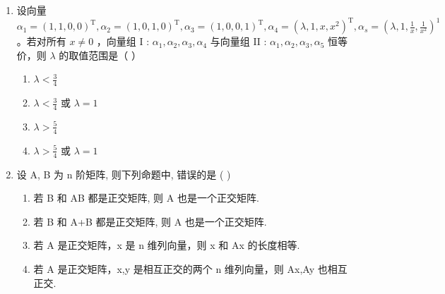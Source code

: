 \documentclass[12pt, a4paper]{ctexart}
\begin{document}
\begin{enumerate}
    ③ 若 $ r(\alpha_{1},\alpha_{2},\alpha_{3})=2 $ ，则 $ \alpha_{4} $ 必不能由 $ \alpha_{1},\alpha_{2},\alpha_{3} $ 线性表示.
    
    ④ 若 $ \alpha_{4} $ 不能由 $ \alpha_{1},\alpha_{2},\alpha_{3} $ 线性表示，则 $ r(\alpha_{1},\alpha_{2},\alpha_{3})\leq2 $
    \begin{enumerate}[label=(\Alph*)]
        \item 1
        \item 2
        \item 3
        \item 4
    \end{enumerate}

    \item 设向量 $ \alpha_{1}=(1,1,0,0)^{\mathrm{T}},\alpha_{2}=(1,0,1,0)^{\mathrm{T}},\alpha_{3}=(1,0,0,1)^{\mathrm{T}},\alpha_{4}=(\lambda,1,x,x^{2})^{\mathrm{T}},\alpha_{s}=\left(\lambda,1,\frac{1}{x},\frac{1}{x^{2}}\right)^{1} $ 。若对所有 $ x \neq 0 $ ，向量组 I : $ \alpha_{1},\alpha_{2},\alpha_{3},\alpha_{4} $ 与向量组 II : $ \alpha_{1},\alpha_{2},\alpha_{3},\alpha_{5} $ 恒等价，则 $ \lambda $ 的取值范围是（ \underline{\hspace{1cm}} ）
    \begin{enumerate}[label=(\Alph*)]
        \item $ \lambda < \frac{3}{4} $
        \item $ \lambda < \frac{3}{4} $ 或 $ \lambda = 1 $
        \item $ \lambda > \frac{5}{4} $
        \item $ \lambda > \frac{5}{4} $ 或 $ \lambda = 1 $
    \end{enumerate}

    \item 设 A, B 为 n 阶矩阵, 则下列命题中, 错误的是 ( \underline{\hspace{1cm}} )
    \begin{enumerate}[label=(\Alph*)]
        \item 若 B 和 AB 都是正交矩阵, 则 A 也是一个正交矩阵.
        \item 若 B 和 A+B 都是正交矩阵, 则 A 也是一个正交矩阵.
        \item 若 A 是正交矩阵，x 是 n 维列向量，则 x 和 Ax 的长度相等.
        \item 若 A 是正交矩阵，x,y 是相互正交的两个 n 维列向量，则 Ax,Ay 也相互正交.
    \end{enumerate}
\end{enumerate}
\end{document}
